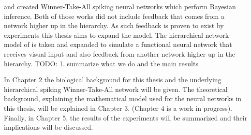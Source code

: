 \citet{nessler} and \citet{nesslerClone} created Winner-Take-All spiking neural networks which perform Bayesian inference. Both of those works did not include feedback that comes from a network higher up in the hierarchy. As such feedback is proven to exist by experiments this thesis aims to expand the model. The hierarchical network model of \citet{nessler} is taken and expanded to simulate a functional neural network that receives visual input and also feedback from another network higher up in the hierarchy.
TODO:
1. summarize what we do and the main results


In Chapter 2 the biological background for this thesis and the underlying hierarchical spiking Winner-Take-All network will be given. The theoretical background, explaining the mathematical model used for the neural networks in this thesis, will be explained in Chapter 3. (Chapter 4 is a work in progress). Finally, in Chapter 5, the results of the experiments will be summarized and their implications will be discussed.